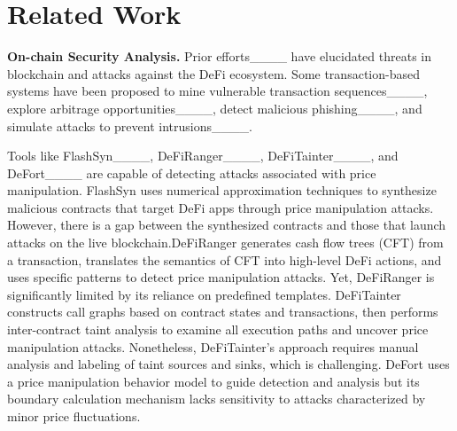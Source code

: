 \section{Related Work}
\label{sec:related}

\noindent
\textbf{On-chain Security Analysis.}
Prior efforts____ have elucidated threats in blockchain and attacks against the DeFi ecosystem. Some transaction-based systems have been proposed to mine vulnerable transaction sequences____, explore arbitrage opportunities____, detect malicious phishing____, and simulate attacks to prevent intrusions____.

Tools like FlashSyn____, DeFiRanger____, DeFiTainter____, and DeFort____ are capable of detecting attacks associated with price manipulation. FlashSyn uses numerical approximation techniques to synthesize malicious contracts that target DeFi apps through price manipulation attacks. However, there is a gap between the synthesized contracts and those that launch attacks on the live blockchain.DeFiRanger generates cash flow trees (CFT) from a transaction, translates the semantics of CFT into high-level DeFi actions, and uses specific patterns to detect price manipulation attacks. Yet, DeFiRanger is significantly limited by its reliance on predefined templates. DeFiTainter constructs call graphs based on contract states and transactions, then performs inter-contract taint analysis to examine all execution paths and uncover price manipulation attacks. Nonetheless, DeFiTainter's approach requires manual analysis and labeling of taint sources and sinks, which is challenging. DeFort uses a price manipulation behavior model to guide detection and analysis but its boundary calculation mechanism lacks sensitivity to attacks characterized by minor price fluctuations.

